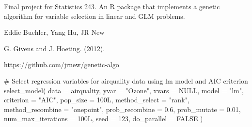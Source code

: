 %
\begin{Description}\relax
Final project for Statistics 243. An R package that implements a genetic algorithm for variable selection in linear and GLM problems.
\end{Description}
%
\begin{Details}\relax

\end{Details}
%
\begin{Author}\relax
Eddie Buehler, Yang Hu, JR New
\end{Author}
%
\begin{References}\relax
G. Givens and J. Hoeting.  (2012).
\end{References}
%
\begin{SeeAlso}\relax
https://github.com/jrnew/genetic-algo
\end{SeeAlso}
%
\begin{Examples}
\begin{ExampleCode}
# Select regression variables for airquality data using lm model and AIC criterion
select_model(
  data = airquality,
  yvar = "Ozone",
  xvars = NULL,
  model = "lm",
  criterion = "AIC",
  pop_size = 100L,
  method_select = "rank",
  method_recombine = "onepoint",
  prob_recombine = 0.6,
  prob_mutate = 0.01,
  num_max_iterations = 100L,
  seed = 123,
  do_parallel = FALSE
)
\end{ExampleCode}
\end{Examples}
